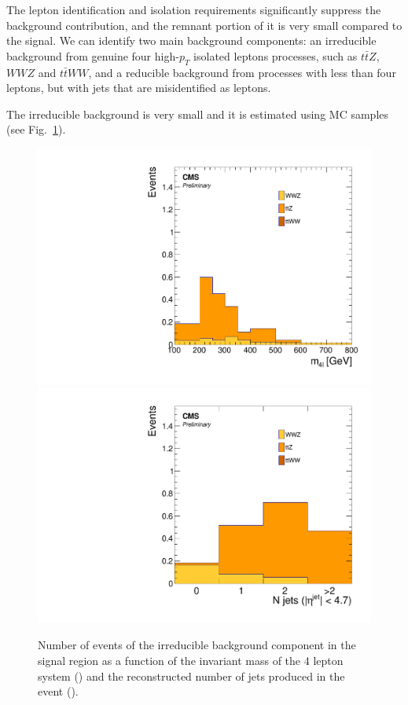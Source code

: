 The lepton identification and isolation requirements significantly suppress
the background contribution, and the remnant portion of it is very small compared to the signal.
We can identify two main background components: an irreducible background from genuine four high-$p_T$ isolated leptons processes, such as $t\bar{t}Z$, $WWZ$ and $t\bar{t}WW$,  and a reducible background from processes with less than four leptons, but with jets that are misidentified as leptons. 

The irreducible background is very small and it is estimated using MC samples (see Fig.~\ref{fig:irr_bkg}).
\begin{figure}[hbtp]
  \begin{center}
\includegraphics[width=\cmsFigWidth]{Figures/Mass_irr}
\includegraphics[width=\cmsFigWidth]{Figures/Jets_irr}
     \caption{Number of events of the irreducible background component in the signal region as a function of the invariant mass of the 4 lepton system (\cmsLeft) and the reconstructed number of jets produced in the event (\cmsRight).}
    \label{fig:irr_bkg}
  \end{center}
\end{figure}

